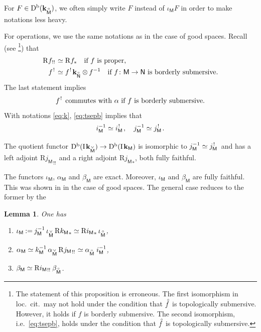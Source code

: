 \documentclass[JEP,XML,SOM,Unicode]{cedram}
\newenvironment{enumeratei}
{\bgroup\def\theenumi{\roman{enumi}}\def\theenumii{\alph{enumii}}\begin{enumerate}}
{\end{enumerate}\egroup}
\theoremstyle{plain}
\newtheorem{lemma}[theorem]{Lemma}
\theoremstyle{definition}
\newcommand{\derived}[1]{\mathrm{#1}}
\newcommand{\derd}{\derived{D}}
\newcommand{\derr}{\derived{R}}
\newcommand{\BDC}{\derd^{\mathrm{b}}}
\newcommand{\roim}[1]{\derr#1_*}
\newcommand{\reeim}[1]{\derr#1_{\mspace{1mu}!!}\mspace{1mu}}
\newcommand{\epb}[1]{#1^{\mspace{1.5mu}!}\mspace{2mu}}
\newcommand{\field}{\mathbf{k}}\let\cor\field
\newcommand{\ind}{\mathrm{I}\mspace{2mu}}
\newcommand{\ifield}{\ind\field}
\newcommand{\bclose}[1]{{\accentset{\vee}{#1}}}\let\cc\bclose
\newcommand{\unbordered}[1]{{\accentset{\circ}{#1}}}
\let\oo \unbordered
\newcommand{\bbM}{\mathsf{M}}
\newcommand{\obM}{\unbordered{\bbM}}
\newcommand{\cbM}{\bclose{\bbM}}
\newcommand{\bbN}{\mathsf{N}}
\newcommand{\obN}{\unbordered{\bbN}}
\newcommand{\inc}[1][\bbM]{k_{#1}}
\newcommand{\defeq}{\mathbin{:=}}\let \seteq\defeq
\newcommand{\tens}[1][]{\mathbin{\otimes_{\raise1.5ex\hbox to-.1em{}#1}}}
\newcommand{\opb}[1]{#1^{-1}}
\begin{document}
For $F\in \BDC(\field_\obM)$,
we often simply write $F$ instead of $\iota_\bbM F$
in order to make notations less heavy.

For operations, we use the same notations as in the case of good spaces.
Recall (see \cite[Prop.\,3.3.19]{DK16}\footnote{The statement of this proposition is erroneous.
The first isomorphism in loc.\ cit.\ may not hold
under the condition that $\oo f$ is topologically submersive.
However, it holds if $f$ is borderly submersive.
The second isomorphism, i.e.\ \eqref{eq:tsepb}, holds under the condition that $\oo f$ is topologically submersive.}) that
\begin{align}
\reeim f&\simeq\roim f\quad \text{if $f$ is proper,}\notag\\
\epb f&\simeq\epb f \field_{\obN}\tens\opb f\quad
\text{if $f\colon\bbM\to\bbN$ is borderly submersive.}
\label{eq:tsepb}
\end{align}
The last statement implies
\begin{equation}
\text{$\epb f$ commutes with $\alpha$
if $f$ is borderly submersive.}\label{st:tsepb}
\end{equation}
With notations \eqref{eq:k}, \eqref{eq:tsepb} implies that
\begin{equation}\label{eq:i*!}
\opb i_\bbM \simeq \epb{i_\bbM},\quad \opb j_\bbM \simeq \epb{j_\bbM}.
\end{equation}

The quotient functor $\BDC(\ifield_\cbM)\to \BDC(\ifield_\bbM)$
is isomorphic to $\opb j_\bbM\simeq\epb{j_\bbM}$
and has a left adjoint $\reeim{{j_\bbM}}$ and a right adjoint $\roim{{j_\bbM}}$, both fully faithful.

The functors $\iota_\bbM$, $\alpha_\bbM$ and $\beta_\bbM$ are exact. Moreover, $\iota_\bbM$ and $\beta_\bbM$ are fully faithful. This was shown in \cite{KS01} in the case of good spaces. The general case reduces to the former by the

\begin{lemma}\label{lem:iab}
One has
\begin{enumeratei}
\item\label{lem:iabi}
$\iota_\bbM \defeq \opb j_\bbM \,\iota_\cbM \,\roim{{\inc}} \simeq \roim{{i_\bbM}}\, \iota_\obM$,
\item\label{lem:iabii}
$\alpha_\bbM \simeq \opb\inc \,\alpha_\cbM \,\reeim{{j_\bbM}} \simeq \alpha_\obM\; \opb i_\bbM$,
\item\label{lem:iabiii}
$\beta_\bbM \simeq \reeim{{i_\bbM}}\, \beta_\obM$.
\end{enumeratei}
\end{lemma}
\end{document}
